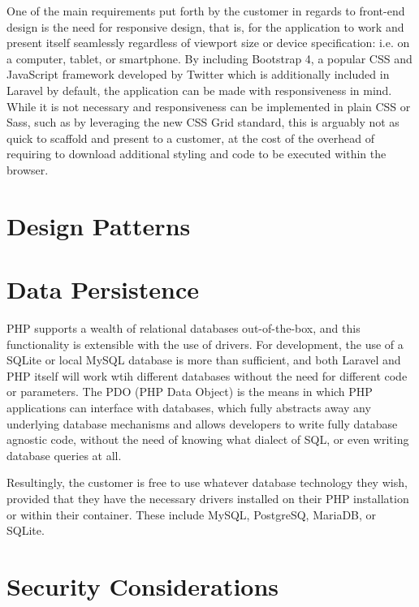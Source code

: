 One of the main requirements put forth by the customer in regards to front-end design is the need for responsive design, that is, for the application to work and present itself seamlessly regardless of viewport size or device specification: i.e. on a computer, tablet, or smartphone. By including Bootstrap 4, a popular CSS and JavaScript framework developed by Twitter which is additionally included in Laravel by default, the application can be made with responsiveness in mind. While it is not necessary and responsiveness can be implemented in plain CSS or Sass, such as by leveraging the new CSS Grid standard, this is arguably not as quick to scaffold and present to a customer, at the cost of the overhead of requiring to download additional styling and code to be executed within the browser. %


\section{Design Patterns}

\section{Data Persistence}

PHP supports a wealth of relational databases out-of-the-box, and this functionality is extensible with the use of drivers. For development, the use of a SQLite or local MySQL database is more than sufficient, and both Laravel and PHP itself will work wtih different databases without the need for different code or parameters. The PDO (PHP Data Object) is the means in which PHP applications can interface with databases, which fully abstracts away any underlying database mechanisms and allows developers to write fully database agnostic code, without the need of knowing what dialect of SQL, or even writing database queries at all.

Resultingly, the customer is free to use whatever database technology they wish, provided that they have the necessary drivers installed on their PHP installation or within their container. These include MySQL, PostgreSQ, MariaDB, or SQLite.


\section{Security Considerations}

